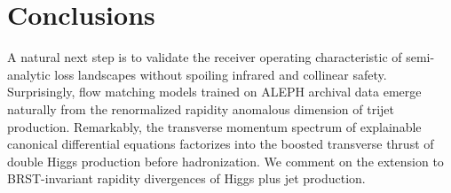 \section{Conclusions}\label{sec:conclusions}

A natural next step is to validate the receiver operating characteristic
of semi-analytic loss landscapes without spoiling infrared and collinear
safety. Surprisingly, flow matching models trained on ALEPH archival
data emerge naturally from the renormalized rapidity anomalous dimension
of trijet production. Remarkably, the transverse momentum spectrum of
explainable canonical differential equations factorizes into the boosted
transverse thrust of double Higgs production before hadronization. We
comment on the extension to BRST-invariant rapidity divergences of Higgs
plus jet production.

